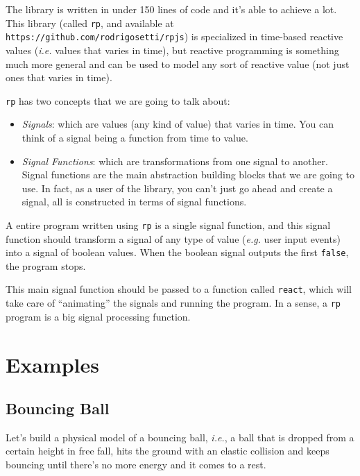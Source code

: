 \documentclass[notitlepage]{article}
\begin{document}
The library is written in under 150 lines of code \- and it's able to achieve a
lot. This library (called \texttt{rp}, and available at
\texttt{https://github.com/rodrigosetti/rpjs}) is specialized in time-based
reactive values (\textit{i.e.} values that varies in time), but reactive
programming is something much more general and can be used to model any sort of
reactive value (not just ones that varies in time).

\texttt{rp} has two concepts that we are going to talk about:

\begin{itemize}
    \item \textit{Signals}: which are values (any kind of value) that varies in
        time. You can think of a signal being a function from time to value.
    \item \textit{Signal Functions}: which are transformations from one signal
        to another. Signal functions are the main abstraction building blocks
        that we are going to use. In fact, as a user of the library, you can't
        just go ahead and create a signal, all is constructed in terms of
        signal functions.
\end{itemize}

A entire program written using \texttt{rp} is a single signal function, and
this signal function should transform a signal of any type of value
(\textit{e.g.} user input events) into a signal of boolean values. When the
boolean signal outputs the first \texttt{false}, the program stops.

This main signal function should be passed to a function called \texttt{react},
which will take care of ``animating'' the signals and running the program. In a
sense, a \texttt{rp} program is a big signal processing function.

\section{Examples}

\subsection{Bouncing Ball}

Let's build a physical model of a bouncing ball, \textit{i.e.}, a ball that is
dropped from a certain height in free fall, hits the ground with an elastic
collision and keeps bouncing until there's no more energy and it comes to a
rest.
\end{document}
